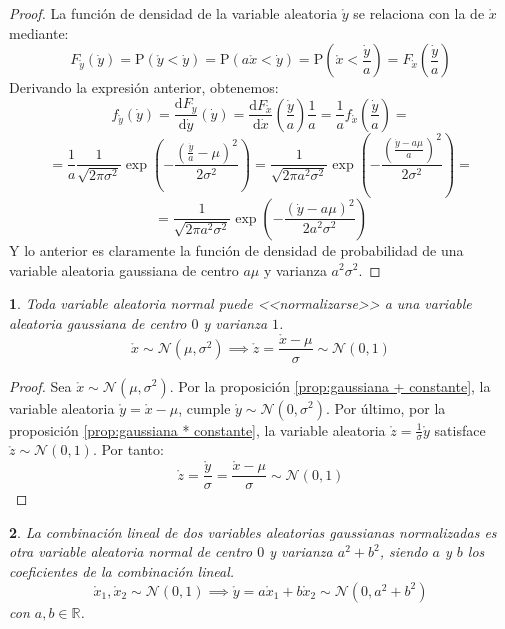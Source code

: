 \documentclass[11pt,a4paper,spanish]{article}
\numberwithin{equation}{section}
\numberwithin{table}{section}
\numberwithin{figure}{section}
\theoremstyle{definition}
\theoremstyle{remark}
\theoremstyle{definition}
\theoremstyle{remark}
\theoremstyle{plain}
\newtheorem{prop}{\protect\propositionname}[section]
\theoremstyle{plain}
\theoremstyle{plain}
\theoremstyle{plain}
\theoremstyle{plain}
\theoremstyle{plain}
\providecommand{\propositionname}{Proposición}
\begin{document}
	\begin{proof}
		La función de densidad de la variable aleatoria $\mathring{y}$ se
		relaciona con la de $\mathring{x}$ mediante:
		\[
		F_{\mathring{y}}\left(\dot{y}\right)=\mathrm{P}\left(\mathring{y}<\dot{y}\right)=\mathrm{P}\left(a\mathring{x}<\dot{y}\right)=\mathrm{P}\left(\mathring{x}<\frac{\dot{y}}{a}\right)=F_{\mathring{x}}\left(\frac{\dot{y}}{a}\right)
		\]
		Derivando la expresión anterior, obtenemos:
		\[
		f_{\mathring{y}}\left(\dot{y}\right)=\frac{\mathrm{d}F_{\mathring{y}}}{\mathrm{d}\dot{y}}\left(\dot{y}\right)=\frac{\mathrm{d}F_{\mathring{x}}}{\mathrm{d}\dot{x}}\left(\frac{\dot{y}}{a}\right)\frac{1}{a}=\frac{1}{a}f_{\mathring{x}}\left(\frac{\dot{y}}{a}\right)=
		\]
		\[
		=\frac{1}{a}\frac{1}{\sqrt{2\pi\sigma^{2}}}\exp\left(-\frac{\left(\frac{\dot{y}}{a}-\mu\right)^{2}}{2\sigma^{2}}\right)=\frac{1}{\sqrt{2\pi a^{2}\sigma^{2}}}\exp\left(-\frac{\left(\frac{\dot{y}-a\mu}{a}\right)^{2}}{2\sigma^{2}}\right)=
		\]
		\[
		=\frac{1}{\sqrt{2\pi a^{2}\sigma^{2}}}\exp\left(-\frac{\left(\dot{y}-a\mu\right)^{2}}{2a^{2}\sigma^{2}}\right)
		\]
		Y lo anterior es claramente la función de densidad de probabilidad
		de una variable aleatoria gaussiana de centro $a\mu$ y varianza $a^{2}\sigma^{2}$.
	\end{proof}
	\begin{prop}
		\label{prop:gaussiana normalizable}Toda variable aleatoria normal
		puede <<normalizarse>> a una variable aleatoria gaussiana de centro
		$0$ y varianza $1$.
		\[
		\mathring{x}\sim\mathcal{N}\left(\mu,\sigma^{2}\right)\implies\mathring{z}=\frac{\mathring{x}-\mu}{\sigma}\sim\mathcal{N}\left(0,1\right)
		\]
	\end{prop}
	\begin{proof}
		Sea $\mathring{x}\sim\mathcal{N}\left(\mu,\sigma^{2}\right)$. Por
		la proposición \vref{prop:gaussiana + constante}, la variable aleatoria
		$\mathring{y}=\mathring{x}-\mu$, cumple $\mathring{y}\sim\mathcal{N}\left(0,\sigma^{2}\right)$.
		Por último, por la proposición \vref{prop:gaussiana * constante},
		la variable aleatoria $\mathring{z}=\frac{1}{\sigma}\mathring{y}$
		satisface $\mathring{z}\sim\mathcal{N}\left(0,1\right)$. Por tanto:
		\[
		\mathring{z}=\frac{\mathring{y}}{\sigma}=\frac{\mathring{x}-\mu}{\sigma}\sim\mathcal{N}\left(0,1\right)
		\]
	\end{proof}
	\begin{prop}
		\label{prop:Gauss suma}La combinación lineal de dos variables aleatorias
		gaussianas normalizadas es otra variable aleatoria normal de centro
		$0$ y varianza $a^{2}+b^{2}$, siendo $a$ y $b$ los coeficientes
		de la combinación lineal.
		\[
		\mathring{x}_{1},\mathring{x}_{2}\sim\mathcal{N}\left(0,1\right)\implies\mathring{y}=a\mathring{x}_{1}+b\mathring{x}_{2}\sim\mathcal{N}\left(0,a^{2}+b^{2}\right)
		\]
		con $a,b\in\mathbb{R}$.
	\end{prop}
\end{document}
